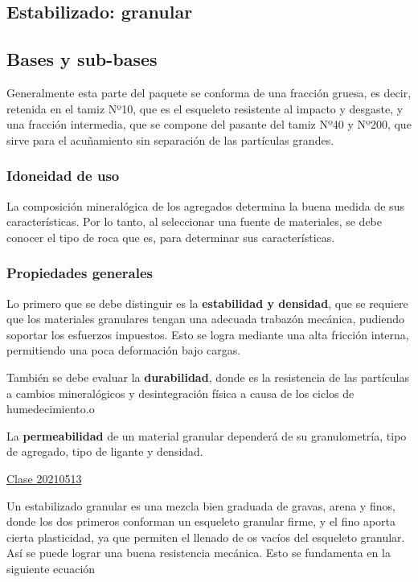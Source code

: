 \documentclass[../main.tex]{subfiles}
\begin{document}
\subsection{Estabilizado: granular}

\subsection{Bases y sub-bases}

Generalmente esta parte del paquete se conforma de una fracción gruesa, es
decir, retenida en el tamiz Nº10, que es el esqueleto resistente al impacto
y desgaste, y una fracción intermedia, que se compone del pasante del tamiz
Nº40 y Nº200, que sirve para el acuñamiento sin separación de las partículas
grandes.

\subsubsection{Idoneidad de uso}

La composición mineralógica de los agregados determina la buena medida de sus
características. Por lo tanto, al seleccionar una fuente de materiales, se
debe conocer el tipo de roca que es, para determinar sus características.

\subsubsection{Propiedades generales}

Lo primero que se debe distinguir es la \textbf{estabilidad y densidad}, que
se requiere que los materiales granulares tengan una adecuada trabazón 
mecánica, pudiendo soportar los esfuerzos impuestos. Esto se logra mediante
una alta fricción interna, permitiendo una poca deformación bajo cargas.

También se debe evaluar la \textbf{durabilidad}, donde es la resistencia de las
partículas a cambios mineralógicos y desintegración física a causa de los ciclos
de humedecimiento.o

La \textbf{permeabilidad} de un material granular dependerá de su granulometría,
tipo de agregado, tipo de ligante y densidad.

\href{https://youtu.be/1-kH3FTW_-Q}{Clase 20210513}

Un estabilizado granular es una mezcla bien graduada de gravas, arena y finos,
donde los dos primeros conforman un esqueleto granular firme, y el fino aporta
cierta plasticidad, ya que permiten el llenado de os vacíos del esqueleto 
granular. Así se puede lograr una buena resistencia mecánica.
Esto se fundamenta en la siguiente ecuación
\end{document}
